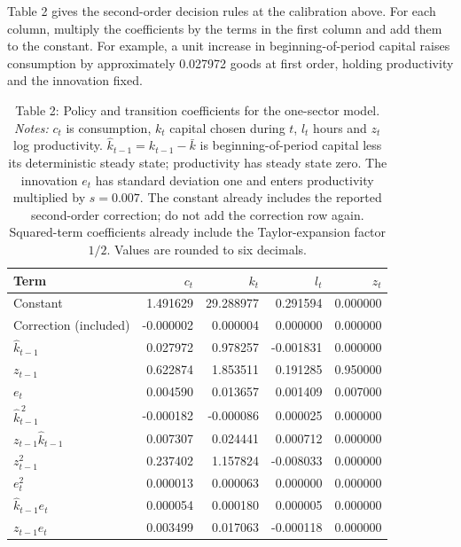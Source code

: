 \documentclass[12pt]{article}
\begin{document}
Table 2 gives the second-order decision rules at the calibration above. For each column, multiply the coefficients by the terms in the first column and add them to the constant. For example, a unit increase in beginning-of-period capital raises consumption by approximately 0.027972 goods at first order, holding productivity and the innovation fixed.

\begin{table}[!htbp]
\centering
\small
\begin{tabular}{lrrrr}
\hline
Term & $c_t$ & $k_t$ & $l_t$ & $z_t$ \\
\hline
Constant & 1.491629 & 29.288977 & 0.291594 & 0.000000 \\
Correction (included) & -0.000002 & 0.000004 & 0.000000 & 0.000000 \\
$\widehat k_{t-1}$ & 0.027972 & 0.978257 & -0.001831 & 0.000000 \\
$z_{t-1}$ & 0.622874 & 1.853511 & 0.191285 & 0.950000 \\
$e_t$ & 0.004590 & 0.013657 & 0.001409 & 0.007000 \\
$\widehat k_{t-1}^{\,2}$ & -0.000182 & -0.000086 & 0.000025 & 0.000000 \\
$z_{t-1}\widehat k_{t-1}$ & 0.007307 & 0.024441 & 0.000712 & 0.000000 \\
$z_{t-1}^{2}$ & 0.237402 & 1.157824 & -0.008033 & 0.000000 \\
$e_t^2$ & 0.000013 & 0.000063 & 0.000000 & 0.000000 \\
$\widehat k_{t-1}e_t$ & 0.000054 & 0.000180 & 0.000005 & 0.000000 \\
$z_{t-1}e_t$ & 0.003499 & 0.017063 & -0.000118 & 0.000000 \\
\hline
\end{tabular}
\captionsetup{labelformat=empty}
\caption{Table 2: Policy and transition coefficients for the one-sector model.\\ \footnotesize\textit{Notes:} $c_t$ is consumption, $k_t$ capital chosen during $t$, $l_t$ hours and $z_t$ log productivity. $\widehat k_{t-1}=k_{t-1}-\bar k$ is beginning-of-period capital less its deterministic steady state; productivity has steady state zero. The innovation $e_t$ has standard deviation one and enters productivity multiplied by $s=0.007$. The constant already includes the reported second-order correction; do not add the correction row again. Squared-term coefficients already include the Taylor-expansion factor $1/2$. Values are rounded to six decimals.}
\end{table}
\end{document}
